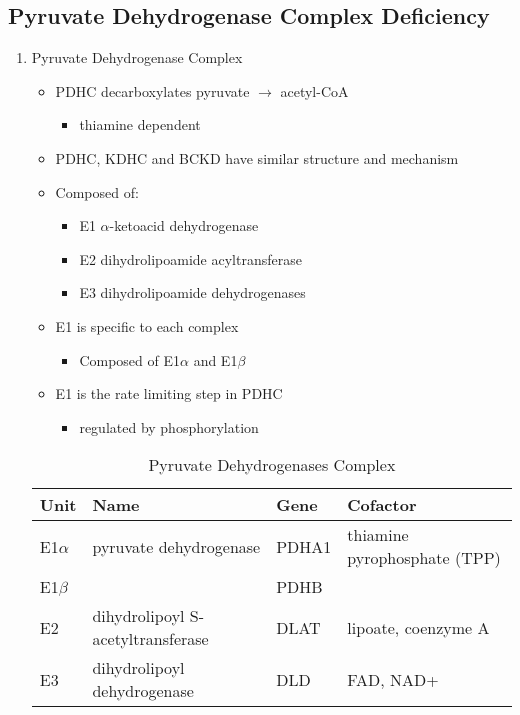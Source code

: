 \documentclass{scrartcl}
\begin{document}
\subsection{Pyruvate Dehydrogenase Complex Deficiency}
\label{sec:org7872ecb}
\begin{enumerate}
\item Pyruvate Dehydrogenase Complex
\label{sec:orgd658b58}
\begin{itemize}
\item PDHC decarboxylates pyruvate \(\to\) acetyl-CoA
\begin{itemize}
\item thiamine dependent
\end{itemize}
\item PDHC, KDHC and BCKD have similar structure and mechanism
\item Composed of:
\begin{itemize}
\item E1 \(\alpha\)-ketoacid dehydrogenase
\item E2 dihydrolipoamide acyltransferase
\item E3 dihydrolipoamide dehydrogenases
\end{itemize}
\item E1 is specific to each complex
\begin{itemize}
\item Composed of E1\(\alpha\) and E1\(\beta\)
\end{itemize}
\item E1 is the rate limiting step in PDHC
\begin{itemize}
\item regulated by phosphorylation
\end{itemize}
\end{itemize}

\begin{table}[htbp]
\caption{\label{tab:org2a40e5c}
Pyruvate Dehydrogenases Complex}
\centering
\begin{tabular}{llll}
Unit & Name & Gene & Cofactor\\
\hline
E1\(\alpha\) & pyruvate dehydrogenase & PDHA1 & thiamine pyrophosphate (TPP)\\
E1\(\beta\) &  & PDHB & \\
E2 & dihydrolipoyl  S-acetyltransferase & DLAT & lipoate, coenzyme A\\
E3 & dihydrolipoyl dehydrogenase & DLD & FAD, NAD+\\
\end{tabular}
\end{table}




\end{enumerate}
\end{document}
